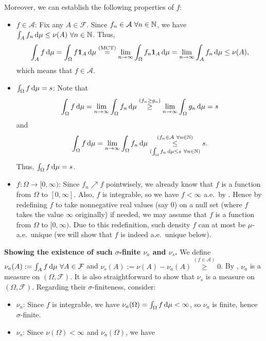 \begin{enumerate}
\begin{pf}
Moreover, we can establish the following properties of \(f\):
\begin{itemize}
\item \underline{\(f\in \mathcal{A}\)}: Fix any \(A\in\mathcal{F}\). Since
\(f_n\in\mathcal{A}~\forall n\in\mathbb{N}\), we have
\(\int_{A}^{}f_n\odif{\mu}\le\nu(A)~\forall n\in\N\). Thus,
\[
\int_{A}^{}f\odif{\mu}=\int_{\Omega}^{}f\indic_{A}\odif{\mu}
\overset{\text{(MCT)}}{=}\lim_{n\to\infty}\int_{\Omega}^{}f_n\indic_{A}\odif{\mu}
=\lim_{n\to\infty}\int_{A}^{}f_n\odif{\mu}\le\nu(A),
\]
which means that \(f\in \mathcal{A}\).
\item \underline{\(\int_{\Omega}^{}f\odif{\mu}=s\)}: Note that
\[
\int_{\Omega}^{}f\odif{\mu}=\lim_{n\to\infty}\int_{\Omega}^{}f_n\odif{\mu}\overset{(f_n\ge
g_n)}{\ge}\lim_{n\to\infty}\int_{\Omega}^{}g_n\odif{\mu}=s
\]
and
\[
\int_{\Omega}^{}f\odif{\mu}=\lim_{n\to\infty}\int_{\Omega}^{}f_n\odif{\mu}
\underset{(\int_{\Omega}^{}f_n\odif{\mu}\le s~\forall n\in\N)}
{\overset{(f_n\in\mathcal{A}~\forall n\in\N)}{\le}}s.
\]
Thus, \(\int_{\Omega}^{}f\odif{\mu}=s\).
\item \underline{\(f:\Omega\to[0,\infty)\)}: Since \(f_n\nearrow f\)
pointwisely, we already know that \(f\) is a function from \(\Omega\) to
\([0,\infty]\).  Also, \(f\) is integrable, so we have \(f<\infty\) a.e.\ by
. Hence by redefining \(f\) to take nonnegative
real values (say \(0\)) on a null set (where \(f\) takes the value \(\infty\) originally)
if needed, we may assume that \(f\) is a function from \(\Omega\) to
\([0,\infty)\). Due to this redefinition, such density \(f\) can at most be
\(\mu\)-a.e.\ unique (we will show that \(f\) is indeed a.e.\ unique below).
\end{itemize}
\textbf{Showing the existence of such \(\sigma\)-finite \(\nu_a\) and \(\nu_s\).}
We define \(\nu_a(A):=\int_{A}^{}f\odif{\mu}~\forall A\in\mathcal{F}\) and
\(\nu_s(A):=\nu(A)-\nu_a(A)\overset{(f\in \mathcal{A})}{\ge}0\). By
, \(\nu_a\) is a measure on
\((\Omega,\mathcal{F})\). It is also straightforward to show that \(\nu_s\) is
a measure on \((\Omega,\mathcal{F})\). Regarding their \(\sigma\)-finiteness, consider:
\begin{itemize}
\item \(\nu_a\): Since \(f\) is integrable, we have
\(\nu_a(\Omega)=\int_{\Omega}^{}f\odif{\mu}<\infty\), so \(\nu_a\) is
finite, hence \(\sigma\)-finite.
\item \(\nu_s\): Since \(\nu(\Omega)<\infty\) and \(\nu_a(\Omega)\), we have

\end{itemize}
\end{pf}
\end{enumerate}
